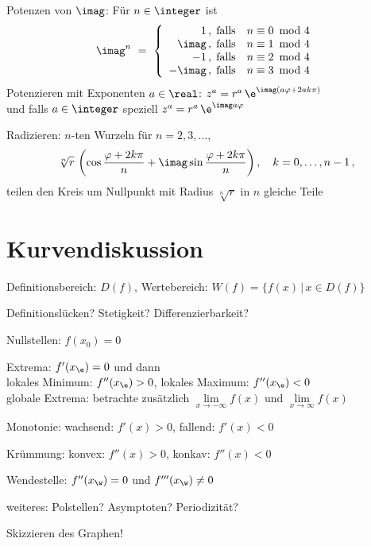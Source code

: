 Potenzen von $\imag$: Für $n\in\integer$ ist
\[
\imag^n
\ =\ \left\{\begin{array}{r@{\,,\; \text{falls}\quad}l}
1      & n\equiv0\!\mod4\\
\imag  & n\equiv1\!\mod4\\
-1     & n\equiv2\!\mod4\\
-\imag & n\equiv3\!\mod4
\end{array}\right.
\]
Potenzieren mit Exponenten $a\in\real$:
$
z^a=r^a\,\e^{\imag(a\varphi+2ak\pi)}
$
\\
und falls $a\in\integer$ speziell
$
z^a=r^a\,\e^{\imag a\varphi}
$

Radizieren: $n$-ten Wurzeln für $n=2,3,\dotsc$,
\[
\sqrt[n]{r}\,\left(
\cos\frac{\varphi+2k\pi}n
+\imag\sin\frac{\varphi+2k\pi}n
\right)
,\quad{}
k=0,\dotsc,n-1
\,,
\]
teilen den Kreis um Nullpunkt mit Radius $\sqrt[n]{r}$ in $n$ gleiche Teile

\section{Kurvendiskussion}

Definitionsbereich: $D(f)$, Wertebereich: $W(f)=\{f(x)\,|\,x\in{}D(f)\}$

Definitionslücken? Stetigkeit? Differenzierbarkeit?

Nullstellen: $f(x_0)=0$

Extrema: $f'(x_{\e})=0$ und dann
\\
lokales Minimum: $f''(x_{\e})>0$, lokales Maximum: $f''(x_{\e})<0$
\\
globale Extrema: betrachte zusätzlich $\lim\limits_{x\to-\infty}f(x)$ und
$\lim\limits_{x\to\infty}f(x)$

Monotonie: wachsend: $f'(x)>0$, fallend: $f'(x)<0$

Krümmung: konvex: $f''(x)>0$, konkav: $f''(x)<0$

Wendestelle: $f''(x_{\w})=0$ und $f'''(x_{\w})\neq0$

weiteres: Polstellen? Asymptoten? Periodizität?

Skizzieren des Graphen!

